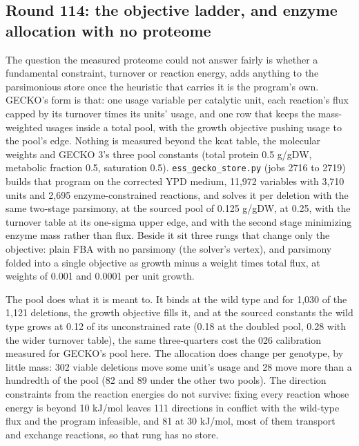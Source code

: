 \subsection{Round 114: the objective ladder, and enzyme allocation with no proteome}
\label{sec:round114}

The question the measured proteome could not answer fairly is whether a fundamental
constraint, turnover or reaction energy, adds anything to the parsimonious store once
the heuristic that carries it is the program's own. GECKO's form is that: one usage
variable per catalytic unit, each reaction's flux capped by its turnover times its
units' usage, and one row that keeps the mass-weighted usages inside a total pool, with
the growth objective pushing usage to the pool's edge. Nothing is measured beyond the
kcat table, the molecular weights and GECKO 3's three pool constants (total protein 0.5
g/gDW, metabolic fraction 0.5, saturation 0.5). \texttt{ess\_gecko\_store.py} (jobs 2716
to 2719) builds that program on the corrected YPD medium, 11,972 variables with 3,710
units and 2,695 enzyme-constrained reactions, and solves it per deletion with the same
two-stage parsimony, at the sourced pool of 0.125 g/gDW, at 0.25, with the turnover
table at its one-sigma upper edge, and with the second stage minimizing enzyme mass
rather than flux. Beside it sit three rungs that change only the objective: plain FBA
with no parsimony (the solver's vertex), and parsimony folded into a single objective as
growth minus a weight times total flux, at weights of 0.001 and 0.0001 per unit growth.

The pool does what it is meant to. It binds at the wild type and for 1,030 of the 1,121
deletions, the growth objective fills it, and at the sourced constants the wild type
grows at 0.12 of its unconstrained rate (0.18 at the doubled pool, 0.28 with the wider
turnover table), the same three-quarters cost the 026 calibration measured for GECKO's
pool here. The allocation does change per genotype, by little mass: 302 viable
deletions move some unit's usage and 28 move more than a hundredth of the pool (82 and
89 under the other two pools). The direction constraints from the reaction energies do
not survive: fixing every reaction whose energy is beyond 10 kJ/mol leaves 111
directions in conflict with the wild-type flux and the program infeasible, and 81 at 30
kJ/mol, most of them transport and exchange reactions, so that rung has no store.


